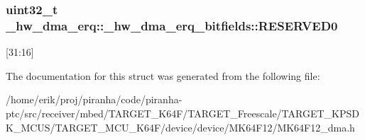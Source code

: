 \subsubsection[{\texorpdfstring{R\+E\+S\+E\+R\+V\+E\+D0}{RESERVED0}}]{\setlength{\rightskip}{0pt plus 5cm}uint32\+\_\+t \+\_\+hw\+\_\+dma\+\_\+erq\+::\+\_\+hw\+\_\+dma\+\_\+erq\+\_\+bitfields\+::\+R\+E\+S\+E\+R\+V\+E\+D0}\hypertarget{struct__hw__dma__erq_1_1__hw__dma__erq__bitfields_aa7f2bbe874bbfd8f462f664b89e87a1d}{}\label{struct__hw__dma__erq_1_1__hw__dma__erq__bitfields_aa7f2bbe874bbfd8f462f664b89e87a1d}
\mbox{[}31\+:16\mbox{]} 

The documentation for this struct was generated from the following file\+:\begin{DoxyCompactItemize}
\item 
/home/erik/proj/piranha/code/piranha-\/ptc/src/receiver/mbed/\+T\+A\+R\+G\+E\+T\+\_\+\+K64\+F/\+T\+A\+R\+G\+E\+T\+\_\+\+Freescale/\+T\+A\+R\+G\+E\+T\+\_\+\+K\+P\+S\+D\+K\+\_\+\+M\+C\+U\+S/\+T\+A\+R\+G\+E\+T\+\_\+\+M\+C\+U\+\_\+\+K64\+F/device/device/\+M\+K64\+F12/M\+K64\+F12\+\_\+dma.\+h\end{DoxyCompactItemize}
